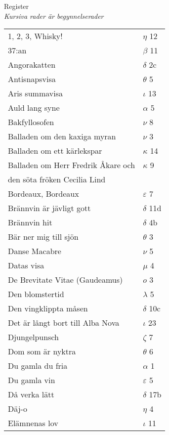 \documentclass[a6paper,10pt]{article}
\begin{document}
\noindent\Large Register
\vspace{5pt}\\
\small\textit{Kursiva rader är begynnelserader}
\begin{table}[!h]
\begin{tabular}{l l}
1, 2, 3, Whisky!&$\eta$ 12\\
37:an&$\beta$ 11\\
Angorakatten&$\delta$ 2c\\
Antisnapsvisa&$\theta$ 5\\
Aris summavisa&$\iota$ 13\\
Auld lang syne&$\alpha$ 5\\
Bakfyllosofen&$\nu$ 8\\
Balladen om den kaxiga myran&$\nu$ 3\\
Balladen om ett kärlekspar&$\kappa$ 14\\
Balladen om Herr Fredrik Åkare och&$\kappa$ 9 \\
den söta fröken Cecilia Lind&	\\
Bordeaux, Bordeaux&$\varepsilon$ 7\\
Brännvin är jävligt gott&$\delta$ 11d\\
Brännvin hit&$\delta$ 4b\\
Bär ner mig till sjön&$\theta$ 3\\
Danse Macabre&$\nu$ 5\\
Datas visa&$\mu$ 4\\
De Brevitate Vitae (Gaudeamus)&$o$ 3\\
Den blomstertid&$\lambda$ 5\\
Den vingklippta måsen&$\delta$ 10c\\
Det är långt bort till Alba Nova&$\iota$ 23\\
Djungelpunsch&$\zeta$ 7\\
Dom som är nyktra&$\theta$ 6\\
Du gamla du fria&$\alpha$ 1\\
Du gamla vin&$\varepsilon$ 5\\
Då verka lätt&$\delta$ 17b\\
Däj-o&$\eta$ 4\\
Elämnenas lov&$\iota$ 11\\
\end{tabular}
\end{table}
\end{document}
